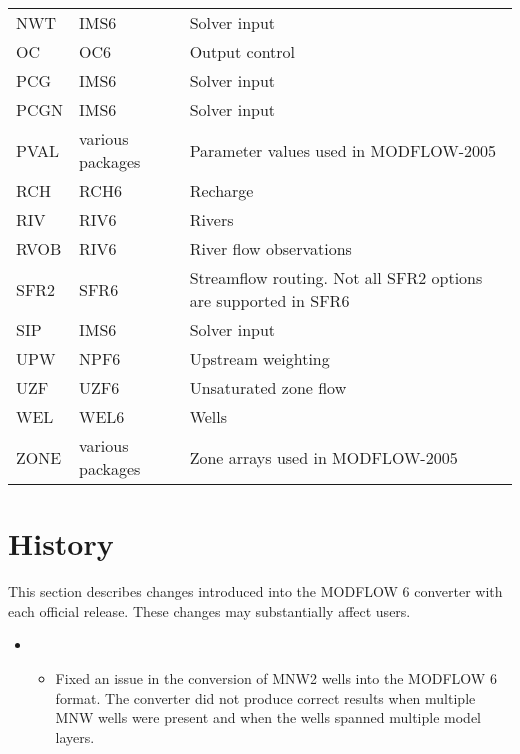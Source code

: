\documentclass[11pt,twoside,twocolumn]{usgsreport}
\begin{document}
\begin{table}[ht]
\begin{tabular*}{\columnwidth}{l l l}
NWT & IMS6 & Solver input \\
OC & OC6 & Output control \\
PCG & IMS6 & Solver input  \\
PCGN & IMS6 & Solver input  \\
PVAL & various packages & Parameter values used in MODFLOW-2005 \\
RCH & RCH6 & Recharge \\
RIV & RIV6 & Rivers \\
RVOB & RIV6 & River flow observations  \\
SFR2 & SFR6 & Streamflow routing. Not all SFR2 options are supported in SFR6  \\
SIP & IMS6 & Solver input  \\
UPW & NPF6 & Upstream weighting \\
UZF & UZF6 & Unsaturated zone flow \\
WEL & WEL6 & Wells \\
ZONE & various packages & Zone arrays used in MODFLOW-2005 \\
\hline 
\end{tabular*}
\label{tab:supportedpackages}
\normalsize
\end{table}


\section{History}
This section describes changes introduced into the MODFLOW 6 converter with each official release.  These changes may substantially affect users.

\begin{itemize}
\item
\currentmodflowversion
\begin{itemize}
  \item Fixed an issue in the conversion of MNW2 wells into the MODFLOW 6 format.  The converter did not produce correct results when multiple MNW wells were present and when the wells spanned multiple model layers.
\end{itemize}
\end{itemize}

\REFSECTION



\justifying
\vspace*{\fill}
\clearpage
\pagestyle{backofreport}
\makebackcover
\end{document}

